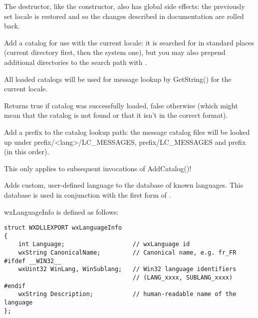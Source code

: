 \label{wxlocaledtor}


The destructor, like the constructor, also has global side effects: the previously
set locale is restored and so the changes described in 
 documentation are rolled back.

\label{wxlocaleaddcatalog}


Add a catalog for use with the current locale: it is searched for in standard
places (current directory first, then the system one), but you may also prepend
additional directories to the search path with 
.

All loaded catalogs will be used for message lookup by GetString() for the
current locale.

Returns true if catalog was successfully loaded, false otherwise (which might
mean that the catalog is not found or that it isn't in the correct format).

\label{wxlocaleaddcataloglookuppathprefix}


Add a prefix to the catalog lookup path: the message catalog files will be
looked up under prefix/<lang>/LC\_MESSAGES, prefix/LC\_MESSAGES and prefix
(in this order).

This only applies to subsequent invocations of AddCatalog()!

\label{wxlocaleaddlanguage}


Adds custom, user-defined language to the database of known languages. This
database is used in conjunction with the first form of 
. 

wxLanguageInfo is defined as follows:

\begin{verbatim}
struct WXDLLEXPORT wxLanguageInfo
{
    int Language;                   // wxLanguage id
    wxString CanonicalName;         // Canonical name, e.g. fr_FR
#ifdef __WIN32__
    wxUint32 WinLang, WinSublang;   // Win32 language identifiers
                                    // (LANG_xxxx, SUBLANG_xxxx)
#endif
    wxString Description;           // human-readable name of the language
};
\end{verbatim}


